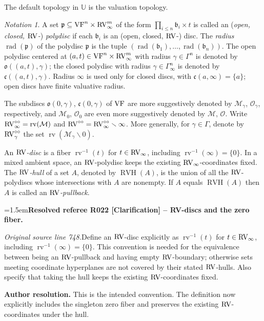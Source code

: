 \documentclass[12pt]{amsart}
\newcommand{\ResolvedRefereeRemark}[5]{%
  \par\medskip\begingroup\normalfont\small\color{gray}%
  \emergencystretch=1.5em\noindent\textbf{Resolved referee R#1 [#2] -- #3.}\par\nobreak\noindent #4\par
  \medskip\color{ResolutionGreen}\noindent\textbf{Author resolution.} #5\par
  \endgroup\medskip
}
\newcommand{\memph}[1]{{\color{magenta}\emph{#1}}}
\theoremstyle{plain}
\theoremstyle{definition}
\theoremstyle{remark}
\newtheorem{nota}[thm]{Notation}
\numberwithin{equation}{section}
\theoremstyle{plain}
\newcommand{\VF}{\textup{VF}}
\newcommand{\RV}{\textup{RV}}
\newcommand{\MM}{\mdl M}
\newcommand{\OO}{\mdl O}
\newcommand{\gb}{\mathfrak{b}}
\newcommand{\gc}{\mathfrak{c}}
\newcommand{\go}{\mathfrak{o}}
\newcommand{\gp}{\mathfrak{p}}
\newcommand{\0}{\emptyset}
\newcommand{\mdl}[1]{\mathcal{#1}}  %
\newcommand{\bb}[1]{\mathbb{#1}}
\newcommand{\sub}{\subseteq}
\newcommand{\mi}{\smallsetminus}
\DeclareMathOperator{\rv}{rv}
\DeclareMathOperator{\rad}{rad}
\DeclareMathOperator{\RVH}{RVH}
\newcommand{\ccirc}{\circ \circ}
\begin{document}
The default topology in $\bb U$ is the valuation topology.

\begin{nota}\label{defn:disc}
A set $\gp \sub \VF^n \times \RV_\infty^m$ of the form $\prod_{i \leq n} \gb_i \times t$ is called an (\memph{open, closed, $\RV$-}) \memph{polydisc} if each $\gb_i$ is an (open, closed, $\RV$-) disc. The \memph{radius} $\rad(\gp)$ of the polydisc $\gp$ is the tuple $(\rad(\gb_1), \ldots, \rad(\gb_n))$. The open polydisc centered at $(a,t) \in \VF^n \times \RV_\infty^m$ with radius $\gamma \in \Gamma^n$ is denoted by $\go((a,t), \gamma)$; the closed polydisc with radius $\gamma \in \Gamma_\infty^n$ is denoted by $\gc((a,t), \gamma)$. Radius $\infty$ is used only for closed discs, with $\gc(a,\infty)=\{a\}$; open discs have finite valuative radius.

The subdiscs $\go(0, \gamma)$, $\gc(0, \gamma)$ of $\VF$ are more suggestively denoted by $\MM_\gamma$, $\OO_\gamma$, respectively, and $\MM_0$, $\OO_0$ are even more suggestively denoted by $\MM$, $\OO$. Write $\RV^{\ccirc}_\infty = \rv(\MM)$ and $\RV^{\ccirc} = \RV^{\ccirc}_\infty \mi \infty$. More generally, for $\gamma \in \Gamma$, denote by $\RV^{\ccirc}_\gamma$ the set $\rv(\MM_{\gamma} \mi 0)$.

An \memph{$\RV$-disc} is a fiber $\rv^{-1}(t)$ for $t\in\RV_\infty$, including $\rv^{-1}(\infty)=\{0\}$. In a mixed ambient space, an $\RV$-polydisc keeps the existing $\RV_\infty$-coordinates fixed. The \memph{$\RV$-hull} of a set $A$, denoted by $\RVH(A)$, is the union of all the $\RV$-polydiscs whose intersections with $A$ are nonempty. If $A$ equals $\RVH(A)$ then $A$ is called an \memph{$\RV$-pullback}.
\end{nota}

\ResolvedRefereeRemark{022}{Clarification}{RV-discs and the zero fiber}{%
\textit{Original source line 748.}\quad Define an $\RV$-disc explicitly as $\rv^{-1}(t)$ for $t\in\RV_\infty$, including $\rv^{-1}(\infty)=\{0\}$. This convention is needed for the equivalence between being an $\RV$-pullback and having empty $\RV$-boundary; otherwise sets meeting coordinate hyperplanes are not covered by their stated $\RV$-hulls. Also specify that taking the hull keeps the existing $\RV$-coordinates fixed.
}{This is the intended convention. The definition now explicitly includes the singleton zero fiber and preserves the existing $\RV$-coordinates under the hull.}
\end{document}
